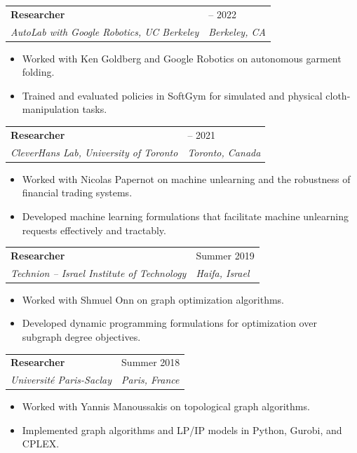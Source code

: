 \documentclass[10pt]{article}
\makeatletter
\newcommand{\cventry}[4]{%
  \begin{tabularx}{\textwidth}{@{}X>{\raggedleft\arraybackslash}p{0.28\textwidth}@{}}
    \textbf{#1} & #2 \\
    \textit{#3} & \textit{#4} \\
  \end{tabularx}
}
\makeatother
\begin{document}
\cventry{Researcher}{2021 -- 2022}{AutoLab with Google Robotics, UC Berkeley}{Berkeley, CA}
\begin{itemize}
  \item Worked with Ken Goldberg and Google Robotics on autonomous garment folding.
  \item Trained and evaluated policies in SoftGym for simulated and physical cloth-manipulation tasks.
\end{itemize}

\cventry{Researcher}{2020 -- 2021}{CleverHans Lab, University of Toronto}{Toronto, Canada}
\begin{itemize}
  \item Worked with Nicolas Papernot on machine unlearning and the robustness of financial trading systems.
  \item Developed machine learning formulations that facilitate machine unlearning requests effectively and tractably.
\end{itemize}

\cventry{Researcher}{Summer 2019}{Technion -- Israel Institute of Technology}{Haifa, Israel}
\begin{itemize}
  \item Worked with Shmuel Onn on graph optimization algorithms.
  \item Developed dynamic programming formulations for optimization over subgraph degree objectives.
\end{itemize}

\cventry{Researcher}{Summer 2018}{Universit\'e Paris-Saclay}{Paris, France}
\begin{itemize}
  \item Worked with Yannis Manoussakis on topological graph algorithms.
  \item Implemented graph algorithms and LP/IP models in Python, Gurobi, and CPLEX.
\end{itemize}
\end{document}
